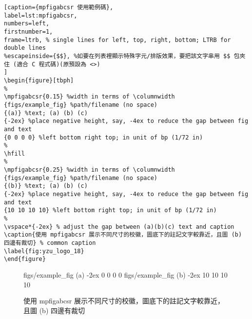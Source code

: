 \begin{enumerate}
{\centering\begin{lstlisting}[caption={mpfigabcsr 使用範例碼},
label=lst:mpfigabcsr,
numbers=left,
firstnumber=1,
frame=ltrb, % single lines for left, top, right, bottom; LTRB for double lines 
%escapeinside={$$}, %如要在列表裡顯示特殊字元/排版效果，要把該文字串用 $$ 包夾住 (適合 C 程式碼)(原預設為 <>)
]
\begin{figure}[tbph]
%
\mpfigabcsr{0.15} %width in terms of \columnwidth
{figs/example_fig} %path/filename (no space)
{(a)} %text; (a) (b) (c)
{-2ex} %place negative height, say, -4ex to reduce the gap between fig and text
{0 0 0 0} %left bottom right top; in unit of bp (1/72 in)
%
\hfill
%
\mpfigabcsr{0.25} %width in terms of \columnwidth
{figs/example_fig} %path/filename (no space)
{(b)} %text; (a) (b) (c)
{-2ex} %place negative height, say, -4ex to reduce the gap between fig and text
{10 10 10 10} %left bottom right top; in unit of bp (1/72 in)
%
\vspace*{-2ex} % adjust the gap between (a)(b)(c) text and caption
\caption{使用 mpfigabcsr 展示不同尺寸的校徽，圖底下的註記文字較靠近，且圖 (b) 四邊有裁切} % common caption
\label{fig:yzu_logo_18}
\end{figure}
\end{lstlisting}\par}

%
\begin{figure}[tbph]
%
{figs/example_fig} %
{(a)} %
{-2ex} %
{0 0 0 0} %
%
\hfill
%
{figs/example_fig} %
{(b)} %
{-2ex} %
{10 10 10 10} %
%
\vspace*{-2ex} %
\caption{使用 mpfigabcsr 展示不同尺寸的校徽，圖底下的註記文字較靠近，且圖 (b) 四邊有裁切} %
\label{fig:yzu_logo_18}
\end{figure}


\end{enumerate}
\clearpage
